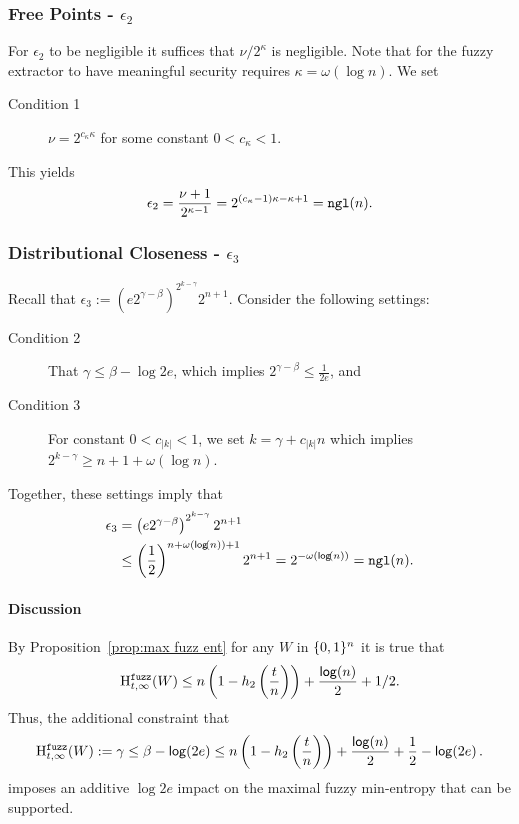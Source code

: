 \subsubsection{Free Points - $\epsilon_2$}
For $\epsilon_2$ to be negligible it suffices that $\nu/2^\kappa$ is negligible.  Note that for the fuzzy extractor to have meaningful security requires $\kappa = \omega(\log{n})$.  We set
\begin{description}
\item[Condition 1] $\nu = 2^{c_{\kappa}\kappa}$ for some constant $0 < c_{\kappa}<1$.
\end{description} 
This yields 
\[
\epsilon_2= \frac{\nu+1}{2^{\kappa-1}} = 2^{(c_{\kappa}-1)\kappa-\kappa+1} = \mathtt{ngl}(n).
\]
\subsubsection{Distributional Closeness - $\epsilon_3$}
Recall that $\epsilon_3:=\left(e2^{\gamma-\beta}\right)^{2^{k-\gamma}}2^{n+1}$.  Consider the following settings:
\begin{description}
\item[Condition 2] That $\gamma\le \beta-\log{2e}$, which implies $2^{\gamma - \beta} \le \frac{1}{2e}$, and 
\item[Condition 3] For constant $0<c_{|k|} < 1$, we set $k = \gamma + c_{|k|}n$ which implies $2^{k-\gamma}\ge n+1+\omega(\log{n})$. 
\end{description}
Together, these settings imply that 
\begin{align*}
\epsilon_3&=\left(e2^{\gamma-\beta}\right)^{2^{k-\gamma}}2^{n+1}\\
&\le\left(\frac{1}{2}\right)^{n+\omega(\mathsf{log}\!\left(n\right))+1}2^{n+1}= 2^{-\omega(\mathsf{log}\!\left(n\right))} = \mathtt{ngl}(n).
\end{align*}

\paragraph{Discussion}
By Proposition~\ref{prop:max fuzz ent} for any $W$ in $\{0, 1\}^n$ it is true that \[
\mathrm{H}^{\mathtt{fuzz}}_{t,\infty}(W)\le n\left(1-h_2\left(\frac{t}{n}\right)\right)+ \frac{\mathsf{log}\!\left(n\right)}{2} +1/2.\]  Thus, the additional constraint that 
\[
\mathrm{H}^{\mathtt{fuzz}}_{t,\infty}(W):=\gamma \le \beta - \mathsf{log}\!\left(2e\right)
\le n\left(1-h_2\left(\frac{t}{n}\right)\right)+\frac{\mathsf{log}\!\left(n\right)}{2}+\frac{1}{2}-\mathsf{log}\!\left(2e\right).\] imposes an additive $\log{2e}$ impact on the maximal fuzzy min-entropy that can be supported. 


